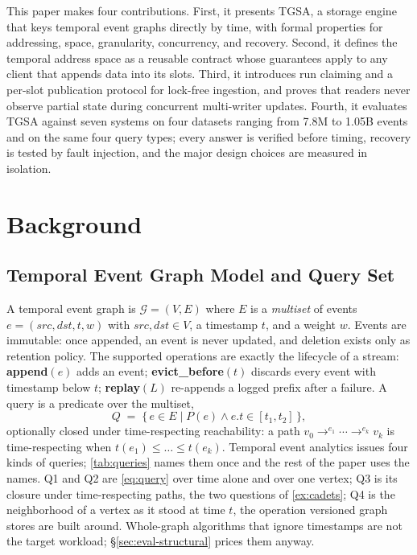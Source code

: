 \documentclass[sigconf,nonacm]{acmart}
\newcommand{\sys}{TGSA\xspace}
\newcommand{\nLanlEvents}{1.05B}
\newcommand{\nSmallEvents}{7.8M}
\begin{document}
This paper makes four contributions. First, it presents \sys, a
storage engine that keys temporal event graphs directly by time, with
formal properties for addressing, space, granularity, concurrency, and
recovery. Second, it defines the temporal address space as a reusable
contract whose guarantees apply to any client that appends data into
its slots. Third, it introduces run claiming and a per-slot publication
protocol for lock-free ingestion, and proves that readers never observe
partial state during concurrent multi-writer updates. Fourth, it
evaluates \sys against seven systems on four datasets ranging from
\nSmallEvents{} to \nLanlEvents{} events and on the same four query
types; every answer is verified before timing, recovery is tested by
fault injection, and the major design choices are measured in
isolation.

\section{Background}\label{sec:background}
\subsection{Temporal Event Graph Model and Query Set}\label{sec:model}
A temporal event graph is $\mathcal{G}=(V, E)$ where $E$ is a
\emph{multiset} of events $e=(src,dst,t,w)$ with $src,dst \in V$, a
timestamp $t$, and a weight $w$. Events are immutable: once appended,
an event is never updated, and deletion exists only as retention
policy. The supported operations are exactly the lifecycle of a stream:
\textbf{append}$(e)$ adds an event; \textbf{evict\_before}$(t)$
discards every event with timestamp below $t$;
\textbf{replay}$(L)$ re-appends a logged prefix after a failure. A
query is a predicate over the multiset,
\begin{equation}
Q \;=\; \{\, e \in E \mid P(e) \wedge e.t \in [t_1, t_2] \,\},
\label{eq:query}
\end{equation}
optionally closed under time-respecting reachability: a path
$v_0 \rightarrow^{e_1} \cdots \rightarrow^{e_k} v_k$ is
time-respecting when $t(e_1) \le \dots \le t(e_k)$. Temporal event
analytics issues four kinds of queries; \cref{tab:queries} names them
once and the rest of the paper uses the names. Q1 and Q2 are
\cref{eq:query} over time alone and over one vertex; Q3 is its closure
under time-respecting paths, the two questions of \cref{ex:cadets}; Q4
is the neighborhood of a vertex as it stood at time $t$, the operation
versioned graph stores are built around. Whole-graph algorithms that
ignore timestamps are not the target workload; \S\ref{sec:eval-structural}
prices them anyway.
\end{document}

